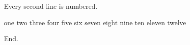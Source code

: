 \documentclass{article}
\begin{document}
Every second line is numbered.

\begin{algorithm}[h]
\caption{Frequency}
\begin{algorithmic}[2]
\STATE one
\STATE two
\STATE three
\STATE four
\STATE five
\STATE six
\STATE seven
\STATE eight
\STATE nine
\STATE ten
\STATE eleven
\STATE twelve
\end{algorithmic}
\end{algorithm}

End.
\end{document}
